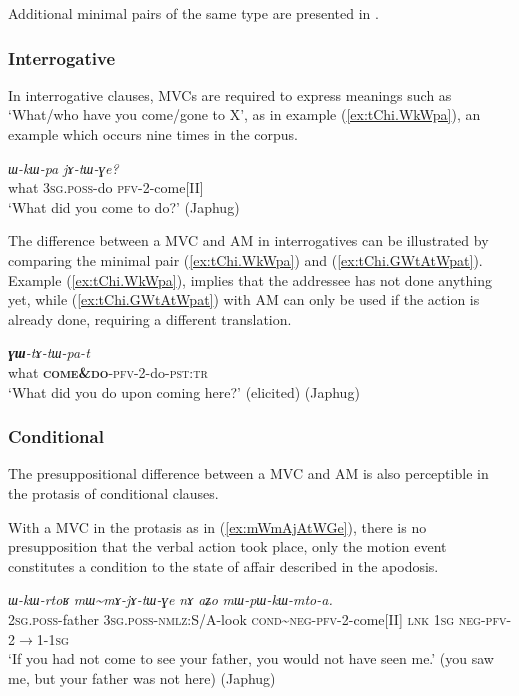 \documentclass[oneside,a4paper,11pt]{article}
\newcommand{\ipa}[1]{{\phon\textit{#1}}}
\newcommand{\redp}{\textasciitilde}
\newcommand{\rouge}[1]{\textbf{#1}}
\newcommand{\fl}{$\rightarrow$}
\begin{document}
Additional minimal pairs of the same type are presented in \citet[202-203]{jacques13harmonization}.


\subsubsection{Interrogative} \label{sec:am.interrogative}
In interrogative clauses, MVCs are required to express meanings such as `What/who have you come/gone to X', as in example (\ref{ex:tChi.WkWpa}), an example which occurs nine times in the corpus.

\begin{exe}
\ex \label{ex:tChi.WkWpa}
\gll \ipa{tɕʰi}	\ipa{ɯ-kɯ-pa}	\ipa{jɤ-tɯ-ɣe?}\\
what \textsc{3sg.poss}-do \textsc{pfv}-2-come[II] \\
\glt `What did you come to do?'  (Japhug)
\end{exe}

The difference between a MVC and AM in interrogatives can be illustrated by comparing the minimal pair  (\ref{ex:tChi.WkWpa}) and (\ref{ex:tChi.GWtAtWpat}). Example (\ref{ex:tChi.WkWpa}),  implies that the addressee has not done anything yet, while (\ref{ex:tChi.GWtAtWpat}) with AM can only be used if the action is already done, requiring a different translation.

\begin{exe}
\ex \label{ex:tChi.GWtAtWpat}
\gll \ipa{tɕʰi}	\ipa{\rouge{ɣɯ}-tɤ-tɯ-pa-t}  \\
what \rouge{\textsc{come\&do}}-\textsc{pfv}-2-do-\textsc{pst:tr}    \\
\glt `What did you do upon coming here?' (elicited) (Japhug)
\end{exe}

 

\subsubsection{Conditional} \label{sec:am.conditional}
The presuppositional difference between a MVC and AM is also perceptible in the protasis of conditional clauses. 

With a MVC in the protasis as in (\ref{ex:mWmAjAtWGe}), there is no presupposition that the verbal action took place, only the motion event constitutes a condition to the state of affair described in the apodosis.

\begin{exe}
\ex \label{ex:mWmAjAtWGe}
\gll \ipa{nɤ-wa}	\ipa{ɯ-kɯ-rtoʁ}	\ipa{mɯ\redp{}mɤ-jɤ-tɯ-ɣe}	\ipa{nɤ}	\ipa{aʑo}	\ipa{mɯ-pɯ-kɯ-mto-a.}
 \\
\textsc{2sg.poss}-father \textsc{3sg.poss-}\textsc{nmlz}:S/A-look \textsc{cond}\redp{}\textsc{neg}-\textsc{pfv}-2-come[II] \textsc{lnk} \textsc{1sg} \textsc{neg}-\textsc{pfv}-2\fl{}1-\textsc{1sg} \\
\glt `If you had not come to see your father, you would not have seen me.' (you saw me, but your father was not here) (Japhug)
\end{exe}
\end{document}
